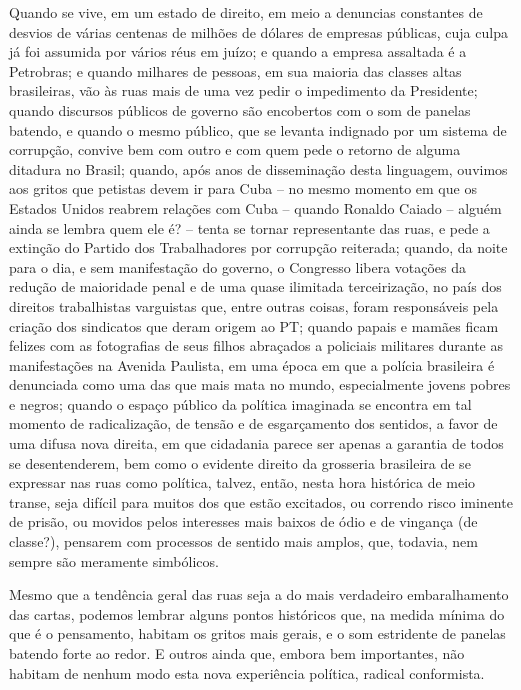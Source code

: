 Quando se vive, em um estado de direito, em meio a denuncias constantes
de desvios de várias centenas de milhões de dólares de empresas
públicas, cuja culpa já foi assumida por vários réus em juízo; e quando
a empresa assaltada é a Petrobras; e quando milhares de pessoas, em sua
maioria das classes altas brasileiras, vão às ruas mais de uma vez pedir
o impedimento da Presidente; quando discursos públicos de governo são
encobertos com o som de panelas batendo, e quando o mesmo público, que
se levanta indignado por um sistema de corrupção, convive bem com outro
e com quem pede o retorno de alguma ditadura no Brasil; quando, após
anos de disseminação desta linguagem, ouvimos aos gritos que petistas
devem ir para Cuba -- no mesmo momento em que os Estados Unidos reabrem
relações com Cuba -- quando Ronaldo Caiado -- alguém ainda se lembra
quem ele é? -- tenta se tornar representante das ruas, e pede a extinção
do Partido dos Trabalhadores por corrupção reiterada; quando, da noite
para o dia, e sem manifestação do governo, o Congresso libera votações
da redução de maioridade penal e de uma quase ilimitada terceirização,
no país dos direitos trabalhistas varguistas que, entre outras coisas,
foram responsáveis pela criação dos sindicatos que deram origem ao PT;
quando papais e mamães ficam felizes com as fotografias de seus filhos
abraçados a policiais militares durante as manifestações na Avenida
Paulista, em uma época em que a polícia brasileira é denunciada como uma
das que mais mata no mundo, especialmente jovens pobres e negros; quando
o espaço público da política imaginada se encontra em tal momento de
radicalização, de tensão e de esgarçamento dos sentidos, a favor de uma
difusa nova direita, em que cidadania parece ser apenas a garantia de
todos se desentenderem, bem como o evidente direito da grosseria
brasileira de se expressar nas ruas como política, talvez, então, nesta
hora histórica de meio transe, seja difícil para muitos dos que estão
excitados, ou correndo risco iminente de prisão, ou movidos pelos
interesses mais baixos de ódio e de vingança (de classe?), pensarem com
processos de sentido mais amplos, que, todavia, nem sempre são meramente
simbólicos.

Mesmo que a tendência geral das ruas seja a do mais verdadeiro
embaralhamento das cartas, podemos lembrar alguns pontos históricos que,
na medida mínima do que é o pensamento, habitam os gritos mais gerais, e
o som estridente de panelas batendo forte ao redor. E outros ainda que,
embora bem importantes, não habitam de nenhum modo esta nova experiência
política, radical conformista.

